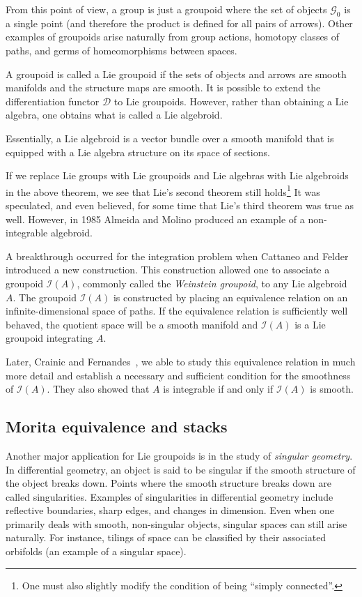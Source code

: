 \documentclass[11pt, letterpaper]{article}
\newcommand{\CG}{\mathcal{G}}
\begin{document}
From this point of view, a group is just a groupoid where the set of objects \( \CG_0 \) is a single point (and therefore the product is defined for all pairs of arrows). Other examples of groupoids arise naturally from group actions, homotopy classes of paths, and germs of homeomorphisms between spaces.

A groupoid is called a Lie groupoid if the sets of objects and arrows are smooth manifolds and the structure maps are smooth. It is possible to extend the differentiation functor \( \mathcal{D} \) to Lie groupoids. However, rather than obtaining a Lie algebra, one obtains what is called a Lie algebroid.

Essentially, a Lie algebroid is a vector bundle over a smooth manifold that is equipped with a Lie algebra structure on its space of sections.

If we replace Lie groups with Lie groupoids and Lie algebras with Lie algebroids in the above theorem, we see that Lie's second theorem still holds\footnote{One must also slightly modify the condition of being ``simply connected''.} It was speculated, and even believed, for some time that Lie's third theorem was true as well. However, in 1985 Almeida and Molino\cite{almeida_suites_1985} produced an example of a non-integrable algebroid.

A breakthrough occurred for the integration problem when Cattaneo and Felder\cite{cattaneo_poisson_2001} introduced a new construction. This construction allowed one to associate a groupoid \( \mathcal{I}(A) \), commonly called the \emph{Weinstein groupoid}, to any Lie algebroid \(A \). The groupoid \( \mathcal{I}(A) \) is constructed by placing an equivalence relation on an infinite-dimensional space of paths. If the equivalence relation is sufficiently well behaved, the quotient space will be a smooth manifold and \( \mathcal{I}(A) \) is a Lie groupoid integrating \( A \).

Later, Crainic and Fernandes~\cite{Cint}, we able to study this equivalence relation in much more detail and establish a necessary and sufficient condition for the smoothness of \( \mathcal{I}(A) \). They also showed that \( A \) is integrable if and only if \( \mathcal{I}(A) \) is smooth.

\subsection{Morita equivalence and stacks}

Another major application for Lie groupoids is in the study of \emph{singular geometry}. In differential geometry, an object is said to be singular if the smooth structure of the object breaks down. Points where the smooth structure breaks down are called singularities. Examples of singularities in differential geometry include reflective boundaries, sharp edges, and changes in dimension. Even when one primarily deals with smooth, non-singular objects, singular spaces can still arise naturally. For instance, tilings of space can be classified by their associated orbifolds (an example of a singular space). 
\end{document}
